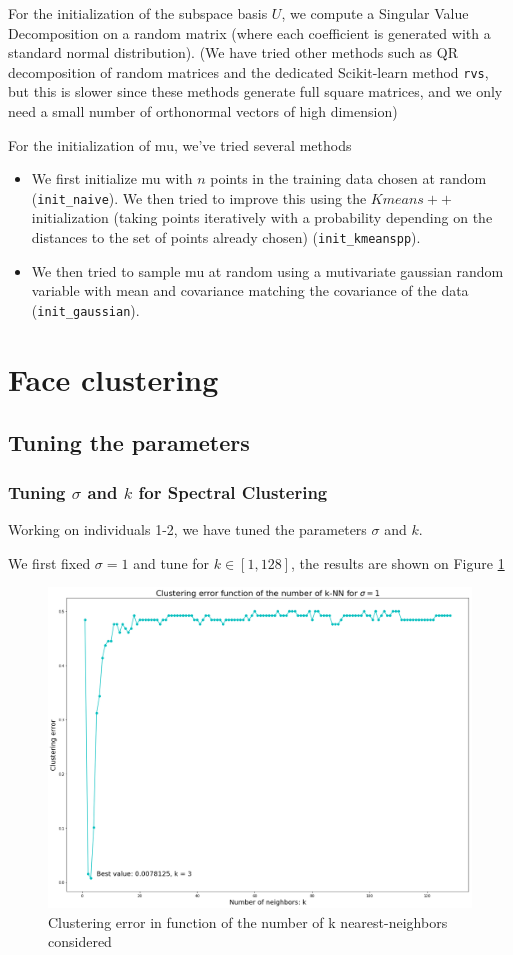 \documentclass[a4paper, 11pt]{article}
\begin{document}
For the initialization of the subspace basis $U$, we compute a
Singular Value Decomposition on a random matrix (where each
coefficient is generated with a standard normal distribution).  (We
have tried other methods such as QR decomposition of random matrices
and the dedicated Scikit-learn method \verb+rvs+, but this is slower
since these methods generate full square matrices, and we only need
a small number of orthonormal vectors of high dimension)


For the initialization of mu, we've tried several methods
\begin{itemize}
\item We first initialize mu with $n$ points in the training data
  chosen at random (\verb+init_naive+). We then tried to improve this using the $Kmeans++$
  initialization (taking points iteratively with a probability
  depending on the distances to the set of points already
  chosen) (\verb+init_kmeanspp+).
\item We then tried to sample mu at random using a mutivariate
  gaussian random variable with mean and covariance matching the
  covariance of the data (\verb+init_gaussian+).
\end{itemize}

\section{Face clustering}

\subsection{Tuning the parameters}
\subsubsection{Tuning $\sigma$ and $k$ for Spectral Clustering}

Working on individuals 1-2, we have tuned the parameters $\sigma$ and $k$.

We first fixed $\sigma = 1$ and tune for $k \in [1, 128]$, the results are shown on Figure \ref{fig:sc_tune_k}

\begin{figure}[H]
	\centering
	\includegraphics[width=.7\linewidth]{imgs/SC_tune_k.png}
	\caption{Clustering error in function of the number of k nearest-neighbors considered}
	\label{fig:sc_tune_k}
\end{figure}
\end{document}
